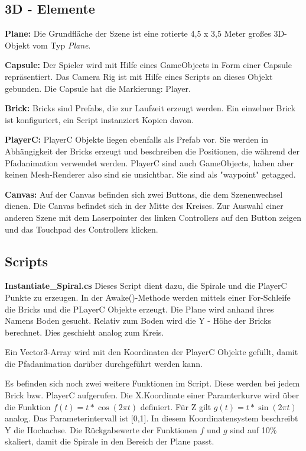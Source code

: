 \subsection{3D - Elemente}

\textbf{Plane: } Die Grundfläche der Szene ist eine rotierte 4,5 x 3,5 Meter großes 3D-Objekt vom Typ \emph{Plane}.

\textbf{Capsule: } Der Spieler wird mit Hilfe eines GameObjects in Form einer Capsule repräsentiert. Das Camera Rig ist mit Hilfe eines Scripts an dieses Objekt gebunden. Die Capsule hat die Markierung: Player.

\textbf{Brick: } Bricks sind Prefabs, die zur Laufzeit erzeugt werden. Ein einzelner Brick ist konfiguriert, ein Script instanziert Kopien davon.

\textbf{PlayerC: } PlayerC Objekte liegen ebenfalls als Prefab vor. Sie werden in Abhängigkeit der Bricks erzeugt und beschreiben die Positionen, die während der Pfadanimation verwendet werden. PlayerC sind auch GameObjects, haben aber keinen Mesh-Renderer also sind sie unsichtbar. Sie sind als "waypoint" getagged.

\textbf{Canvas: } Auf der Canvas befinden sich zwei Buttons, die dem Szenenwechsel dienen. Die Canvas befindet sich in der Mitte des Kreises. Zur Auswahl einer anderen Szene mit dem Laserpointer des linken Controllers auf den Button zeigen und das Touchpad des Controllers klicken. 

\subsection{Scripts}
\textbf{Instantiate\_Spiral.cs}
Dieses Script dient dazu, die Spirale und die PlayerC Punkte zu erzeugen. In der Awake()-Methode werden mittels einer For-Schleife die Bricks und die PLayerC Objekte erzeugt. Die Plane wird anhand ihres Namens \glqq Boden{}\grqq{} gesucht. Relativ zum Boden wird die Y - Höhe der Bricks berechnet. Dies geschieht analog zum Kreis.

Ein Vector3-Array wird mit den Koordinaten der PlayerC Objekte gefüllt, damit die Pfadanimation darüber durchgeführt werden kann.

Es befinden sich noch zwei weitere Funktionen im Script. Diese werden bei jedem Brick bzw. PlayerC aufgerufen. Die X.Koordinate einer Paramterkurve wird über die Funktion $ f(t) = t * \cos(2 \pi t) $ definiert. Für Z gilt $g(t) = t * \sin(2 \pi t)$ analog. Das Parameterintervall ist [0,1]. 
 In diesem Koordinatensystem beschreibt Y die Hochachse.
Die Rückgabewerte der Funktionen $f$ und $g$ sind auf 10\% skaliert, damit die Spirale in den Bereich der Plane passt.


